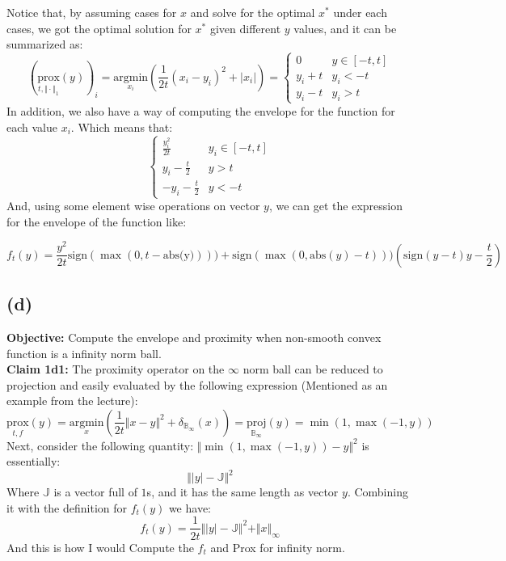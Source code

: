 \documentclass[]{article}
\begin{document}
    Notice that, by assuming cases for $x$ and solve for the optimal $x^*$ under each cases, we got the optimal solution for $x^*$ given different $y$ values, and it can be summarized as: 
    \begin{equation*}\tag{1c3}\label{eqn:1c3}
        \left(
            \underset{t, \Vert \cdot\Vert_1}{\text{prox}}(y)
        \right)_i = 
        \underset{x_i}{\text{argmin}}
        \left(
            \frac{1}{2t}
            (x_i - y_i)^2 + |x_i|
        \right) = 
        \begin{cases}
            0 & y \in [-t, t]\\
            y_i + t & y_i < -t\\
            y_i - t & y_i > t
        \end{cases}
    \end{equation*}
    In addition, we also have a way of computing the envelope for the function for each value $x_i$. Which means that: 
    \begin{equation*}\tag{1c4}\label{eqn:1c4}
        \begin{cases}
            \frac{y_i^2}{2t} & y_i \in [-t, t] \\
            y_i - \frac{t}{2} & y > t\\
            -y_i - \frac{t}{2} & y < -t 
        \end{cases}
    \end{equation*}
    And, using some element wise operations on vector $y$, we can get the expression for the envelope of the function like: 


    \begin{equation*}\tag{1c4.1}\label{eqn:1c4.1}
        f_t(y) = 
        \frac{y^2}{2t}\text{sign}(\max(0, t - \text{abs(y)}))) + 
        \text{sign}(\max(0, \text{abs}(y) - t)))(\text{sign}(y - t)y - \frac{t}{2})
    \end{equation*}
    
    \subsection*{(d)}
    \textbf{Objective: } Compute the envelope and proximity when non-smooth convex function is a infinity norm ball. 
    \\
    \textbf{Claim 1d1:} The proximity operator on the $\infty$ norm ball can be reduced to projection and easily evaluated by the following expression (Mentioned as an example from the lecture): 
    $$
        \underset{t, f}{\text{prox}}(y) = \underset{x}{\text{argmin}} \left(
            \frac{1}{2t}\Vert x - y \Vert^2 + \delta_{\mathbb{B}_\infty}(x)
        \right)
        =
        \underset{\mathbb{B}_\infty}{\text{proj}}(y) = \min(1, \max(-1, y))
    $$
    Next, consider the following quantity: $\Vert \min(1, \max(-1, y)) - y \Vert^2$ is essentially: 
    $$
        \Vert |y| - \mathbb{J} \Vert^2
    $$
    Where $\mathbb{J}$ is a vector full of $1$s, and it has the same length as vector $y$. Combining it with the definition for $f_t(y)$ we have: 
    $$
        f_t(y) = \frac{1}{2t} \Vert |y| - \mathbb{J}\Vert^2 + \Vert x\Vert_\infty
    $$
    And this is how I would Compute the $f_t$ and Prox for infinity norm. 
\end{document}
